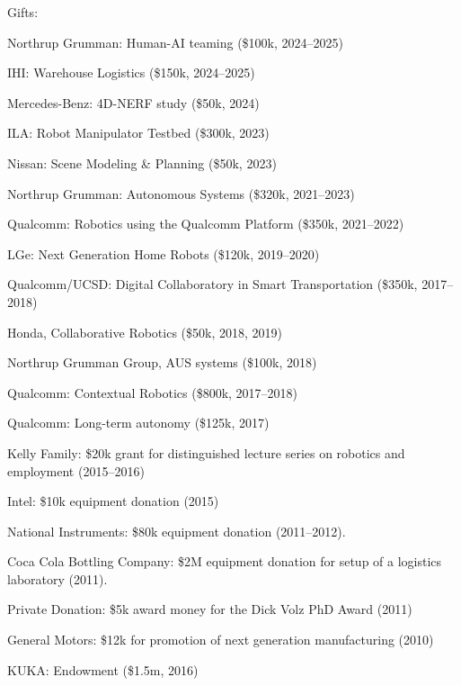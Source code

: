 \documentclass{article}
\begin{document}
\begin{cv}
	\begin{cvlist}{Gifts:}
		\item Northrup Grumman: Human-AI teaming (\$100k, 2024--2025)
		\item IHI: Warehouse Logistics (\$150k, 2024--2025)
		\item Mercedes-Benz: 4D-NERF study (\$50k, 2024)
		\item ILA: Robot Manipulator Testbed (\$300k, 2023)
		\item Nissan: Scene Modeling \& Planning (\$50k, 2023)
		\item Northrup Grumman: Autonomous Systems (\$320k, 2021--2023)
		\item Qualcomm: Robotics using the Qualcomm Platform (\$350k, 2021--2022)
		\item LGe: Next Generation Home Robots (\$120k, 2019--2020)
		\item Qualcomm/UCSD: Digital Collaboratory in Smart Transportation
		(\$350k, 2017--2018)
		\item Honda, Collaborative Robotics (\$50k, 2018, 2019)
		\item Northrup Grumman Group, AUS systems (\$100k, 2018)
		\item Qualcomm: Contextual Robotics (\$800k, 2017--2018)
		\item Qualcomm: Long-term autonomy (\$125k, 2017)
		\item Kelly Family: \$20k grant for distinguished lecture series on
		robotics and employment (2015--2016)
		\item Intel: \$10k equipment donation (2015)
		\item National Instruments: \$80k equipment donation (2011--2012).
		\item Coca Cola Bottling Company: \$2M equipment donation for setup of
		a logistics laboratory (2011).
		\item Private Donation: \$5k award money for the Dick Volz PhD Award
		(2011)
		\item General Motors: \$12k for promotion of next generation
		manufacturing (2010)
		\item KUKA: Endowment (\$1.5m, 2016)
	\end{cvlist}


\end{cv}
\end{document}
